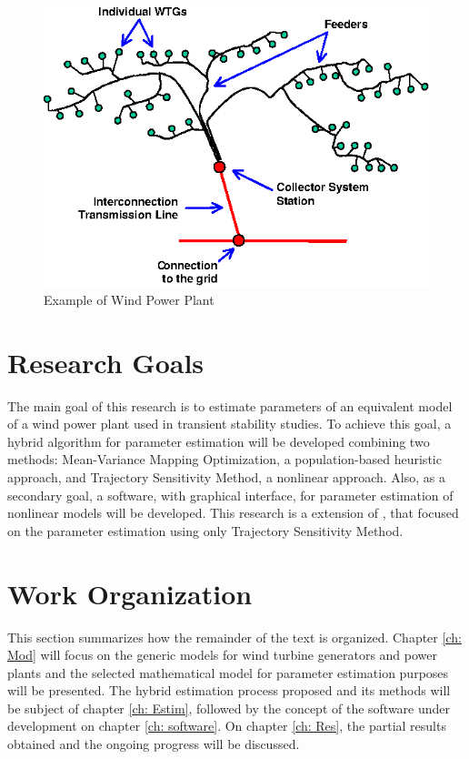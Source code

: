 \begin{figure}[h]
	\caption{Example of Wind Power Plant}
	\begin{center}
		\includegraphics[scale=1.25]{Images/WPP.eps}
	\end{center}
	\label{fig: WPP}
\end{figure}

\section{Research Goals}

The main goal of this research is to estimate parameters of an equivalent model of a wind power plant used in transient stability studies. To achieve this goal, a hybrid algorithm for parameter estimation will be developed combining two methods: Mean-Variance Mapping Optimization, a population-based heuristic approach, and Trajectory Sensitivity Method, a nonlinear approach. Also, as a secondary goal, a software, with graphical interface, for parameter estimation of nonlinear models will be developed. This research is a extension of \cite{Cari2015}, that focused on the parameter estimation using only Trajectory Sensitivity Method.

\section{Work Organization}

This section summarizes how the remainder of the text is organized. Chapter \ref{ch: Mod} will focus on the generic models for wind turbine generators and power plants and the selected mathematical model for parameter estimation purposes will be presented. The hybrid estimation process proposed and its methods will be subject of chapter \ref{ch: Estim}, followed by the concept of the software under development on chapter \ref{ch: software}. On chapter \ref{ch: Res}, the partial results obtained and the ongoing progress will be discussed.